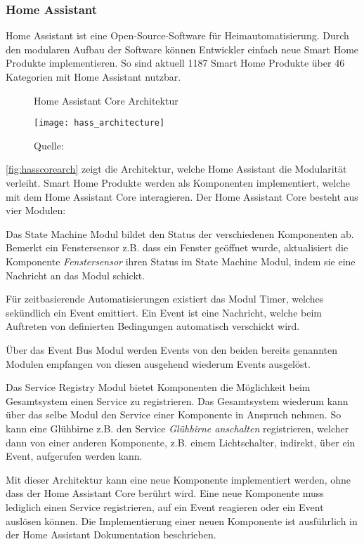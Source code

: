 \subsubsection{Home Assistant}

Home Assistant ist eine Open-Source-Software für Heimautomatisierung.
Durch den modularen Aufbau der Software können Entwickler einfach neue Smart Home Produkte implementieren.
So sind aktuell 1187 Smart Home Produkte über 46 Kategorien mit Home Assistant nutzbar.

\begin{figure}[ht]
	\centering
	\caption{Home Assistant Core Architektur}
	\texttt{[image: hass\_architecture]}
	\caption*{\footnotesize{Quelle: }}
	\label{fig:hasscorearch}
\end{figure}

\autoref{fig:hasscorearch} zeigt die Architektur, welche Home Assistant die Modularität verleiht.
Smart Home Produkte werden als Komponenten implementiert, welche mit dem Home Assistant Core interagieren.
Der Home Assistant Core besteht aus vier Modulen:

Das State Machine Modul bildet den Status der verschiedenen Komponenten ab.
Bemerkt ein Fenstersensor z.B. dass ein Fenster geöffnet wurde, aktualisiert die Komponente \textit{Fenstersensor} ihren Status im State Machine Modul, indem sie eine Nachricht an das Modul schickt.

Für zeitbasierende Automatisierungen existiert das Modul Timer, welches sekündlich ein Event emittiert.
Ein Event ist eine Nachricht, welche beim Auftreten von definierten Bedingungen automatisch verschickt wird.

Über das Event Bus Modul werden Events von den beiden bereits genannten Modulen empfangen von diesen ausgehend wiederum Events ausgelöst.

Das Service Registry Modul bietet Komponenten die Möglichkeit beim Gesamtsystem einen Service zu registrieren.
Das Gesamtsystem wiederum kann über das selbe Modul den Service einer Komponente in Anspruch nehmen.
So kann eine Glühbirne z.B. den Service \textit{Glühbirne anschalten} registrieren, welcher dann von einer anderen Komponente, z.B. einem Lichtschalter, indirekt, über ein Event, aufgerufen werden kann.

Mit dieser Architektur kann eine neue Komponente implementiert werden, ohne dass der Home Assistant Core berührt wird.
Eine neue Komponente muss lediglich einen Service registrieren, auf ein Event reagieren oder ein Event auslösen können.
Die Implementierung einer neuen Komponente ist ausführlich in der Home Assistant Dokumentation beschrieben.

